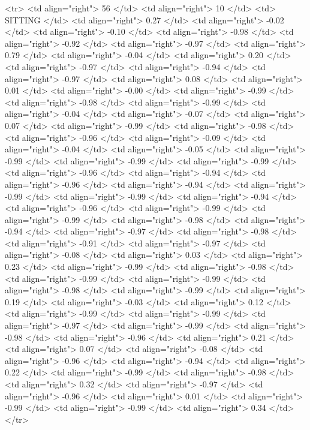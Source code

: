   <tr> <td align="right"> 56 </td> <td align="right">  10 </td> <td> SITTING </td> <td align="right"> 0.27 </td> <td align="right"> -0.02 </td> <td align="right"> -0.10 </td> <td align="right"> -0.98 </td> <td align="right"> -0.92 </td> <td align="right"> -0.97 </td> <td align="right"> 0.79 </td> <td align="right"> -0.04 </td> <td align="right"> 0.20 </td> <td align="right"> -0.97 </td> <td align="right"> -0.94 </td> <td align="right"> -0.97 </td> <td align="right"> 0.08 </td> <td align="right"> 0.01 </td> <td align="right"> -0.00 </td> <td align="right"> -0.99 </td> <td align="right"> -0.98 </td> <td align="right"> -0.99 </td> <td align="right"> -0.04 </td> <td align="right"> -0.07 </td> <td align="right"> 0.07 </td> <td align="right"> -0.99 </td> <td align="right"> -0.98 </td> <td align="right"> -0.96 </td> <td align="right"> -0.09 </td> <td align="right"> -0.04 </td> <td align="right"> -0.05 </td> <td align="right"> -0.99 </td> <td align="right"> -0.99 </td> <td align="right"> -0.99 </td> <td align="right"> -0.96 </td> <td align="right"> -0.94 </td> <td align="right"> -0.96 </td> <td align="right"> -0.94 </td> <td align="right"> -0.99 </td> <td align="right"> -0.99 </td> <td align="right"> -0.94 </td> <td align="right"> -0.96 </td> <td align="right"> -0.99 </td> <td align="right"> -0.99 </td> <td align="right"> -0.98 </td> <td align="right"> -0.94 </td> <td align="right"> -0.97 </td> <td align="right"> -0.98 </td> <td align="right"> -0.91 </td> <td align="right"> -0.97 </td> <td align="right"> -0.08 </td> <td align="right"> 0.03 </td> <td align="right"> 0.23 </td> <td align="right"> -0.99 </td> <td align="right"> -0.98 </td> <td align="right"> -0.99 </td> <td align="right"> -0.99 </td> <td align="right"> -0.98 </td> <td align="right"> -0.99 </td> <td align="right"> 0.19 </td> <td align="right"> -0.03 </td> <td align="right"> 0.12 </td> <td align="right"> -0.99 </td> <td align="right"> -0.99 </td> <td align="right"> -0.97 </td> <td align="right"> -0.99 </td> <td align="right"> -0.98 </td> <td align="right"> -0.96 </td> <td align="right"> 0.21 </td> <td align="right"> 0.07 </td> <td align="right"> -0.08 </td> <td align="right"> -0.96 </td> <td align="right"> -0.94 </td> <td align="right"> 0.22 </td> <td align="right"> -0.99 </td> <td align="right"> -0.98 </td> <td align="right"> 0.32 </td> <td align="right"> -0.97 </td> <td align="right"> -0.96 </td> <td align="right"> 0.01 </td> <td align="right"> -0.99 </td> <td align="right"> -0.99 </td> <td align="right"> 0.34 </td> </tr>
